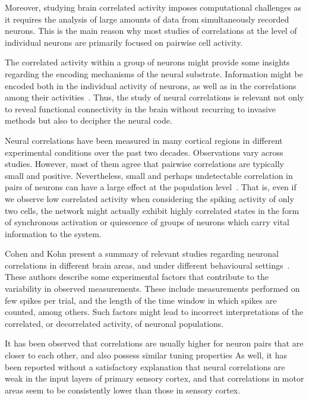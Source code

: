 \documentclass[11pt,letterpaper]{article}
\begin{document}
        Moreover, studying brain correlated activity imposes computational
        challenges as it requires the analysis of large amounts of data from
        simultaneously recorded neurons.
        This is the main reason why most studies of correlations at the level
        of individual neurons are primarily focused on pairwise cell activity.
        
        The correlated activity within a group of neurons might provide some
        insights regarding the encoding mechanisms of the neural substrate.
        Information might be encoded both in the individual activity of neurons,
        as well as in the correlations among their 
        activities~\cite{eyherabide2013and}.
        Thus, the study of neural correlations is relevant not only to reveal
        functional connectivity in the brain without recurring to invasive
        methods but also to decipher the neural code.

        Neural correlations have been measured in many cortical regions in
        different experimental conditions over the past two decades.
        Observations vary across studies.
        However, most of them agree that pairwise correlations are typically
        small and positive.
        Nevertheless, small and perhaps undetectable correlation in pairs of
        neurons can have a large effect at the population level~\cite{averbeck2006neural}.
        That is, even if we observe low correlated activity when considering
        the spiking activity of only two cells, the network might
        actually exhibit highly correlated states in the form of
        synchronous activation or quiescence of groups of neurons which
        carry vital information to the system.

        Cohen and Kohn present a summary of relevant
        studies regarding neuronal correlations in different brain areas, and under
        different behavioural settings~\cite{cohen2011measuring}.
        These authors describe some experimental factors that contribute to
        the variability in observed measurements.
        These include measurements performed on few spikes per trial, and 
        the length of the time window in which spikes are counted, among others.
        Such factors might lead to incorrect interpretations of the correlated,
        or decorrelated activity, of neuronal populations.
        
        It has been observed that correlations are usually higher for neuron pairs 
        that are closer to each other, and also possess similar tuning properties
        As well, it has been reported without a satisfactory explanation that neural correlations
        are weak in the input layers of primary sensory cortex, and that
        correlations in motor areas seem to be consistently lower than those
        in sensory cortex.
        
\end{document}
